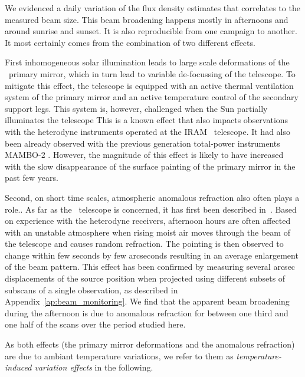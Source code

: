 We evidenced a daily variation of the flux density estimates that correlates to the
measured beam size. This beam broadening happens mostly in afternoons and around
sunrise and sunset. It is also reproducible from one campaign to another. It most certainly
comes from the combination of two different effects.

First inhomogeneous solar illumination leads to large scale deformations of the
\trentemetre\ primary mirror, which in turn lead to variable de-focussing of the
telescope. {\lp To mitigate this effect, the telescope is equipped with an
  active thermal ventilation system of the primary mirror and an active
  temperature control of the secondary support legs. This system is, however,
  challenged when the Sun partially illuminates the telescope}
  {\lp This is a known effect that also impacts
  observations with the heterodyne instruments operated at the IRAM
  \trentemetre\ telescope. It had also been already observed with the previous
  generation total-power instruments MAMBO-2 \citep{Kreysa1999}.} However, the
magnitude of this effect is likely to have increased with the slow disappearance
of the surface painting of the primary mirror in the past few years.

Second, on short time scales, atmospheric anomalous refraction {\lp also often plays a
  role.}. As far as the \trentemetre\ telescope is concerned, it has first
been described in~\citet{Altenhoff1987}. Based on experience with
  the heterodyne receivers, afternoon hours are
  often affected with an unstable atmosphere when rising moist air moves
  through the beam of the telescope and causes random refraction. The pointing
  is then observed to change within few seconds by few arcseconds {\lp resulting in an average
    enlargement of the beam pattern.} This effect has been confirmed by
  measuring several arcsec displacements of the source position when projected using
  different subsets of subscans of a single observation, as described
  in Appendix~\ref{ap:beam_monitoring}. We find that the apparent beam broadening during
  the afternoon is due to anomalous refraction for between one third
  and one half of the scans over the period studied here.


{\lp As both effects (the primary mirror deformations and the anomalous
  refraction) are due to ambiant temperature variations, we refer to them as
  \emph{temperature-induced variation effects} in the following.}\\



